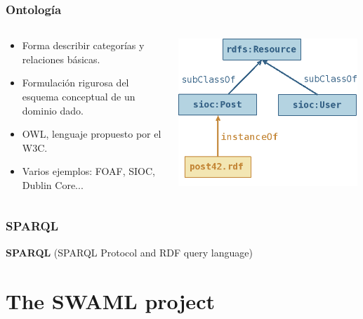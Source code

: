 \documentclass[spanish,notes=hide]{beamer}
\begin{document}
{
  \frametitle{Ontología}

  \begin{columns}
   \begin{column}{0.4\textwidth}
	\begin{itemize}
	 \item Forma describir categorías y relaciones básicas.
	 \item Formulación rigurosa del esquema conceptual de un dominio dado.
	 \item OWL, lenguaje propuesto por el W3C.
	 \item Varios ejemplos: FOAF, SIOC, Dublin Core...
	\end{itemize}
   \end{column}
   \begin{column}{0.6\textwidth}
	\includegraphics[width=0.99\textwidth]{images/ontologia.png}
   \end{column}
  \end{columns}
}
\frame
{
  \frametitle{SPARQL}

  \begin{center}
    \textbf{SPARQL} (SPARQL Protocol and RDF query language)\\
    \SPARQL
  \end{center}
}

\section{The SWAML project}
\end{document}
